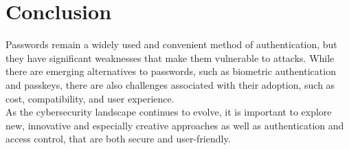 \documentclass[conference]{IEEEtran}
\begin{document}
\section{Conclusion}
Passwords remain a widely used and convenient method of authentication, but they have significant weaknesses that make them vulnerable to attacks. While there are emerging alternatives to passwords, such as biometric authentication and passkeys, there are also challenges associated with their adoption, such as cost, compatibility, and user experience.\\
As the cybersecurity landscape continues to evolve, it is important to explore new, innovative and especially creative approaches as well as authentication and access control, that are both secure and user-friendly.
\end{document}
